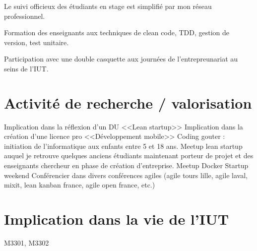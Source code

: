 \documentclass[a4paper]{article}
\begin{document}
Le suivi officieux des étudiants en stage est simplifié par mon réseau professionnel.

Formation des enseignants aux techniques de clean code, TDD, gestion de version, test unitaire.

Participation avec une double casquette aux journées de l'entrepreunariat au seins de l'IUT.

\section{Activité de recherche / valorisation}


Implication dans la réflexion d'un DU <<Lean startup>>
Implication dans la création d'une licence pro <<Développement mobile>> 
Coding gouter : initiation de l'informatique aux enfants entre 5 et 18 ans.
Meetup lean startup auquel je retrouve quelques anciens étudiants maintenant porteur de projet et des enseignants chercheur en phase de création d'entreprise.
Meetup Docker
Startup weekend
Conférencier dans divers conférences agiles (agile tours lille, agile laval, mixit, lean kanban france, agile open france, etc.)

\section{Implication dans la vie de l'IUT}
M3301, M3302
\end{document}
